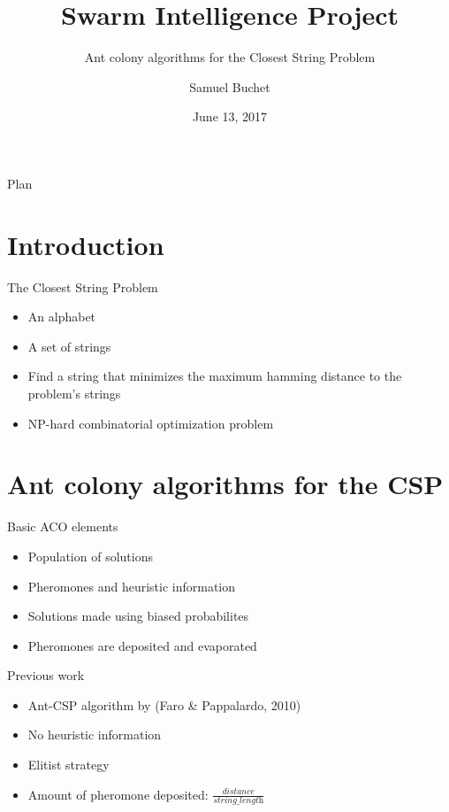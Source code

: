 \documentclass{beamer}
\title{Swarm Intelligence Project}
\subtitle{Ant colony algorithms for the Closest String Problem}
\author{Samuel Buchet}
\institute[Université libre de Bruxelles] %
{
  Swarm Intelligence\\
  Université Libre de Bruxelles
 }
\date{June 13, 2017}
\begin{document}
\begin{frame}
  \titlepage
\end{frame}

\begin{frame}{Plan}
  \tableofcontents
\end{frame}

\section{Introduction}

\begin{frame}{The Closest String Problem}
    \begin{itemize}
        \item An alphabet
        \item A set of strings
        \item Find a string that minimizes the maximum hamming distance to the problem's strings
        \item NP-hard combinatorial optimization problem
    \end{itemize}
\end{frame}

\section{Ant colony algorithms for the CSP}

\begin{frame}{Basic ACO elements}
    \begin{itemize}
        \item Population of solutions
        \item Pheromones and heuristic information
        \item Solutions made using biased probabilites
        \item Pheromones are deposited and evaporated
    \end{itemize}
\end{frame}

\begin{frame}{Previous work}
    \begin{itemize}
        \item Ant-CSP algorithm by (Faro \& Pappalardo, 2010)
        \item No heuristic information
        \item Elitist strategy
        \item Amount of pheromone deposited: $\frac{distance}{\textit{string\_length}}$
    \end{itemize}
\end{frame}
\end{document}
